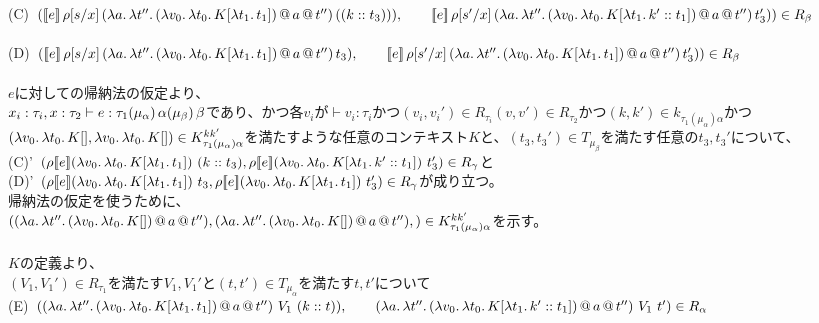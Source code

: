 (C)\ $(\CPS{e}{\rho[\Change{x}{s}]}
           {\LamP{a}{\Lam{t''}
               {\App{\App{\LamP{v_0}{\Lam{t_0}{K[\Lam{t_1}{t_1}]}}}{a}}{t''}}}}{(\ConsP{k}{t_3})}),\\
  \qquad \CPS{e}{\rho[\Change{x}{s'}]}
           {\LamP{a}{\Lam{t''}
               {\App{\App{\LamP{v_0}{\Lam{t_0}{K[\Lam{t_1}{\Cons{k'}{t_1}}]}}}{a}}{t''}}}}{t_3'}))\in R_{\beta}$\\
\\
(D)\ $(\CPS{e}{\rho[\Change{x}{s}]}
           {\LamP{a}{\Lam{t''}
               {\App{\App{\LamP{v_0}{\Lam{t_0}{K[\Lam{t_1}{t_1}]}}}{a}}{t''}}}}{t_3}),\\
  \qquad \CPS{e}{\rho[\Change{x}{s'}]}
           {\LamP{a}{\Lam{t''}
               {\App{\App{\LamP{v_0}{\Lam{t_0}{K[\Lam{t_1}{t_1}]}}}{a}}{t''}}}}{t_3'}))\in R_{\beta}$\\
\\
$e$に対しての帰納法の仮定より、\\
$x_i:\tau_i, x:\tau_2 \vdash e:\tau_1 \TrailType{\alpha} \TrailType{\beta}$であり、かつ各$v_i$が$\vdash v_i:\tau_i$かつ$(v_i,v_i') \in R_{\tau_i} (v, v')\in R_{\tau_2}$かつ$(k,k')\in k_{\tau_1(\mu_{\alpha})\alpha}$かつ$(\Lam{v_0}{\Lam{t_0}{K[]}}, \Lam{v_0}{\Lam{t_0}{K[]}})\in  K^{kk'}_{\tau_1(\mu_{\alpha})\alpha}$を満たすような任意のコンテキスト$K$と、$(t_3, t_3') \in T_{\mu_{\beta}}$を満たす任意の$t_3, t_3'$について、\\
(C)'\ $(\rho \CPSTh{e} \LamP{v_0}{\Lam{t_0}{K[\Lam{t_1}{t_1}]}}\ \ConsP{k}{t_3}, \rho \CPSTh{e} \LamP{v_0}{\Lam{t_0}{K[\Lam{t_1}{\Cons{k'}{t_1}}]}}\ t_3')\in R_{\gamma}$と\\
(D)'\ $(\rho \CPSTh{e} \LamP{v_0}{\Lam{t_0}{K[\Lam{t_1}{t_1}]}}\ t_3, \rho \CPSTh{e} \LamP{v_0}{\Lam{t_0}{K[\Lam{t_1}{t_1}]}}\ t_3')\in R_{\gamma}$が成り立つ。\\
帰納法の仮定を使うために、\\
$(\LamP{a}{\Lam{t''}
  {\App{\App{\LamP{v_0}{\Lam{t_0}{K[]}}}{a}}{t''}}},
  \LamP{a}{\Lam{t''}
    {\App{\App{\LamP{v_0}{\Lam{t_0}{K[]}}}{a}}{t''}}},)\in K^{kk'}_{\tau_1(\mu_{\alpha})\alpha}$を示す。\\
  \\
  $K$の定義より、\\
  $(V_1, V_1')\in R_{\tau_1}$を満たす$V_1,V_1'$と$(t,t')\in T_{\mu_{\alpha}}$を満たす$t,t'$について\\
  (E)\ $(\LamP{a}{\Lam{t''}{\App{\App{\LamP{v_0}{\Lam{t_0}{K[\Lam{t_1}{t_1}]}}}{a}}{t''}}}\ V_1\ (\Cons{k}{t})),\\
  \qquad \LamP{a}{\Lam{t''}{\App{\App{\LamP{v_0}{\Lam{t_0}{K[\Lam{t_1}{\Cons{k'}{t_1}}]}}}{a}}{t''}}}\ V_1\ t')\in R_{\alpha}$\\
